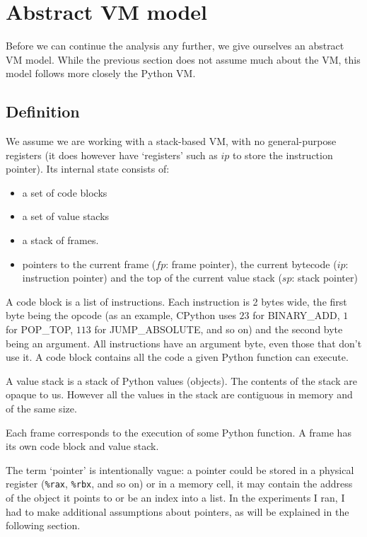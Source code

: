 \documentclass[english]{article}
\begin{document}
\section{Abstract VM model}

Before we can continue the analysis any further, we give ourselves an abstract VM model. While the previous section does not assume much about the VM, this model follows more closely the Python VM.
\subsection{Definition}

We assume we are working with a stack-based VM, with no general-purpose registers (it does however have `registers' such as $ip$ to store the instruction pointer). Its internal state consists of:
\begin{itemize}
	\item a set of code blocks 
	\item a set of value stacks 
	\item a stack of frames.  
	\item pointers to the current frame ($fp$: frame pointer), the current bytecode ($ip$: instruction pointer) and the top of the current value stack ($sp$: stack pointer)
\end{itemize}

A code block is a list of instructions. Each instruction is 2 bytes wide, the first byte being the opcode (as an example, CPython uses $23$ for BINARY\_ADD, $1$ for POP\_TOP, $113$ for JUMP\_ABSOLUTE, and so on) and the second byte being an argument. All instructions have an argument byte, even those that don't use it. A code block contains all the code a given Python function can execute.

A value stack is a stack of Python values (objects). The contents of the stack are opaque to us. However all the values in the stack are contiguous in memory and of the same size.

Each frame corresponds to the execution of some Python function. A frame has its own code block and value stack.

The term `pointer' is intentionally vague: a pointer could be stored in a physical register (\texttt{\%rax}, \texttt{\%rbx}, and so on) or in a memory cell, it may contain the address of the object it points to or be an index into a list. In the experiments I ran, I had to make additional assumptions about pointers, as will be explained in the following section.
\end{document}
